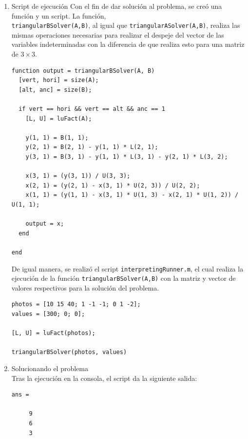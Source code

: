 \documentclass[english,notitlepage,letterpaper, 10pt]{article} %
\begin{document}
\begin{enumerate}
\begin{enumerate}
          \item Script de ejecución
            Con el fin de dar solución al problema, se creó una función y un script. La función, \\
            \texttt{triangular\-BSolver(A,B)}, al igual que \texttt{triangularASolver(A,B)}, realiza las mismas operaciones necesarias para realizar el despeje del vector de las variables indeterminadas con la diferencia de que realiza esto para una matriz de $3 \times 3$.

            \begin{lstlisting}
function output = triangularBSolver(A, B)
  [vert, hori] = size(A);
  [alt, anc] = size(B);

  if vert == hori && vert == alt && anc == 1
    [L, U] = luFact(A);

    y(1, 1) = B(1, 1);
    y(2, 1) = B(2, 1) - y(1, 1) * L(2, 1);
    y(3, 1) = B(3, 1) - y(1, 1) * L(3, 1) - y(2, 1) * L(3, 2);

    x(3, 1) = (y(3, 1)) / U(3, 3);
    x(2, 1) = (y(2, 1) - x(3, 1) * U(2, 3)) / U(2, 2);
    x(1, 1) = (y(1, 1) - x(3, 1) * U(1, 3) - x(2, 1) * U(1, 2)) / U(1, 1);

    output = x;
  end

end

            \end{lstlisting}
             
            De igual manera, se realizó el script \texttt{interpretingRunner.m}, el cual realiza la ejecución de la función \texttt{triangular\-BSolver(A,B)} con la matriz y vector de valores respectivos para la solución del problema.

            \begin{lstlisting}
photos = [10 15 40; 1 -1 -1; 0 1 -2];
values = [300; 0; 0];

[L, U] = luFact(photos);

triangularBSolver(photos, values)
            \end{lstlisting}

          \item Solucionando el problema \\
            Tras la ejecución en la consola, el script da la siguiente salida:
            
            \begin{lstlisting}
ans = 
      
     9
     6
     3
            \end{lstlisting}


\end{enumerate}
\end{enumerate}
\end{document}
